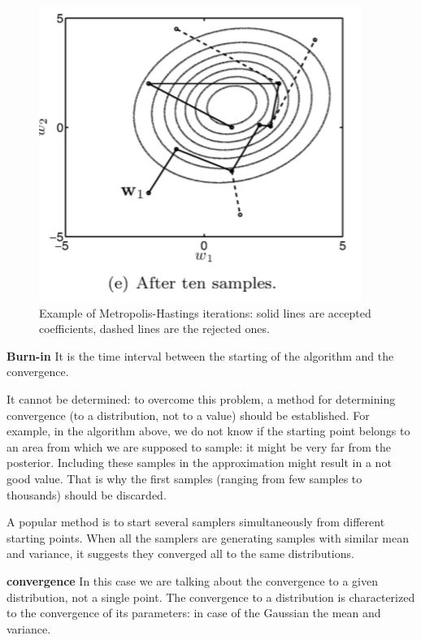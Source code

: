 \begin{figure}
\centering
\includegraphics[scale=0.4]{img/randomWalk}
\caption{Example of Metropolis-Hastings iterations: solid lines are accepted coefficients, dashed lines are the rejected ones.}
\label{randomWalk}
\end{figure}

\begin{definition}{\textbf{Burn-in}} It is the time interval between the starting of the algorithm and the convergence. 
\end{definition}
It cannot be determined: to overcome this problem, a method for determining convergence (to a distribution, not to a value) should be established. For example, in the algorithm above, we do not know if the starting point belongs to an area from which we are supposed to sample: it might be very far from the posterior. Including these samples in the approximation might result in a not good value. That is why the first samples (ranging from few samples to thousands) should be discarded.

A popular method is to start several samplers simultaneously from different starting points. When all the samplers are generating samples with similar mean and variance, it suggests they converged all to the same distributions.

\begin{definition}{\textbf{convergence} In this case we are talking about the convergence to a given distribution, not a single point. The convergence to a distribution is characterized to the convergence of its parameters: in case of the Gaussian the mean and variance.}
\end{definition}

